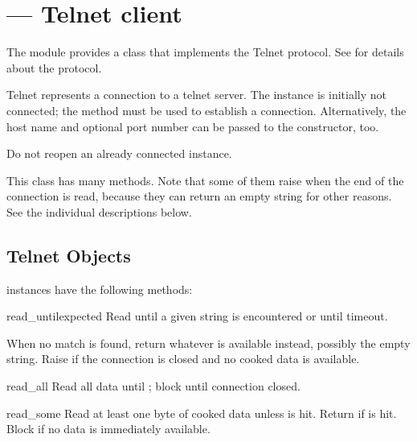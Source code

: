 \section{ ---
         Telnet client}


The  module provides a  class that
implements the Telnet protocol.  See  for details about the
protocol.


\begin{classdesc}{Telnet}{}
 represents a connection to a telnet server. The
instance is initially not connected; the  method must
be used to establish a connection.  Alternatively, the host name and
optional port number can be passed to the constructor, too.

Do not reopen an already connected instance.

This class has many  methods.  Note that some of them 
raise  when the end of the connection is read,
because they can return an empty string for other reasons.  See the
individual descriptions below.
\end{classdesc}


\subsection{Telnet Objects \label{telnet-objects}}

 instances have the following methods:


\begin{methoddesc}{read_until}{expected}
Read until a given string is encountered or until timeout.

When no match is found, return whatever is available instead,
possibly the empty string.  Raise  if the connection
is closed and no cooked data is available.
\end{methoddesc}

\begin{methoddesc}{read_all}{}
Read all data until \EOF{}; block until connection closed.
\end{methoddesc}

\begin{methoddesc}{read_some}{}
Read at least one byte of cooked data unless \EOF{} is hit.
Return  if \EOF{} is hit.  Block if no data is immediately
available.
\end{methoddesc}

